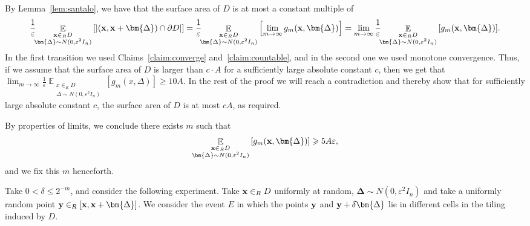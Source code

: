 \documentclass[10pt,a4paper]{article}
\newcommand\card[1]{\left| {#1} \right|}
\newcommand\Expect[2]{{\mathop{\mathbb{E}}_{#1}\left[ {#2} \right]}}
\newcommand\eps{\varepsilon}
\renewcommand\geq{\geqslant}
\renewcommand\leq{\leqslant}
\newcommand{\De}{\Delta}
\begin{document}
    By Lemma~\ref{lem:santalo}, we have that the surface area of $D$ is at most a constant multiple of
    \[
    \frac{1}{\eps}\hspace{-0.5ex}\Expect{\substack{{\bf x}\in_R D\\ \bm{\De}\sim N(0,\eps^2 I_n)}}{\card{({\bf x},{\bf x}+\bm{\De})\cap \partial D}}
    =\frac{1}{\eps}\hspace{-0.5ex}\Expect{\substack{{\bf x}\in_R D\\ \bm{\De}\sim N(0,\eps^2 I_n)}}{\lim_{m\rightarrow \infty} g_{m}({\bf x},\bm{\De})}
    =\lim_{m\rightarrow \infty} \frac{1}{\eps}\hspace{-0.5ex}\Expect{\substack{{\bf x}\in_R D\\ \bm{\De}\sim N(0,\eps^2 I_n)}}{g_{m}({\bf x},\bm{\De})}.
    \]
    In the first transition we used Claims~\ref{claim:converge} and~\ref{claim:countable},
    and in the second one we used monotone convergence. Thus, if we assume that the surface area of
    $D$ is larger than $c\cdot A$ for a sufficiently large absolute constant $c$, then we get that
    $\lim_{m\rightarrow \infty} \frac{1}{\eps}\Expect{\substack{x\in_R D\\ \De\sim N(0,\eps^2 I_n)}}{g_{m}(x,\De)}\geq 10 A$.
    In the rest of the proof we will reach a contradiction and thereby show that for sufficiently large
    absolute constant $c$, the surface area of $D$ is at most $cA$, as required.

    By properties of limits, we conclude there exists $m$ such that
    \begin{equation}\label{eq:apx_2}
    \Expect{\substack{{\bf x}\in_R D\\ \bm{\De}\sim N(0,\eps^2 I_n)}}{g_{m}({\bf x},\bm{\De})}\geq 5 A\eps,
    \end{equation}
    and we fix this $m$ henceforth.

    Take $0<\delta\leq 2^{-m}$, and consider the following experiment. Take ${\bf x}\in_R D$ uniformly at random,
    $\bm{\De}\sim N(0,\eps^2 I_n)$ and take a uniformly random point ${\bf y}\in_R [{\bf x},{\bf x}+\bm{\De}]$. We
    consider the event $E$ in which the points ${\bf y}$ and ${\bf y}+\delta\bm{\De}$ lie in different cells in the tiling
    induced by $D$.
\end{document}
